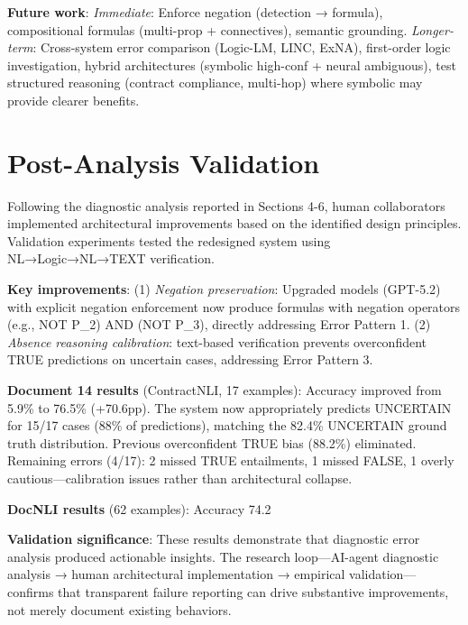 \documentclass[12pt,a4paper]{article}
\begin{document}
\textbf{Future work}: \textit{Immediate}: Enforce negation (detection → formula), compositional formulas (multi-prop + connectives), semantic grounding. \textit{Longer-term}: Cross-system error comparison (Logic-LM, LINC, ExNA), first-order logic investigation, hybrid architectures (symbolic high-conf + neural ambiguous), test structured reasoning (contract compliance, multi-hop) where symbolic may provide clearer benefits.

\section{Post-Analysis Validation}

Following the diagnostic analysis reported in Sections 4-6, human collaborators implemented architectural improvements based on the identified design principles. Validation experiments  tested the redesigned system using NL→Logic→NL→TEXT verification.

\textbf{Key improvements}: (1) \textit{Negation preservation}: Upgraded models (GPT-5.2) with explicit negation enforcement now produce formulas with 
negation operators (e.g., NOT P\_2) AND (NOT P\_3), directly addressing Error Pattern 1. (2) \textit{Absence reasoning calibration}: text-based verification prevents overconfident TRUE predictions on uncertain cases, addressing Error Pattern 3.

\textbf{Document 14 results} (ContractNLI, 17 examples): Accuracy improved from 5.9\% to 76.5\% (+70.6pp). The system now appropriately predicts UNCERTAIN for 15/17 cases (88\% of predictions), matching the 82.4\% UNCERTAIN ground truth distribution. Previous overconfident TRUE bias (88.2\%) eliminated. Remaining errors (4/17): 2 missed TRUE entailments, 1 missed FALSE, 1 overly cautious—calibration issues rather than architectural collapse.

\textbf{DocNLI results} (62 examples): Accuracy 74.2%

\textbf{Validation significance}: These results demonstrate that diagnostic error analysis produced actionable insights. The research loop—AI-agent diagnostic analysis → human architectural implementation → empirical validation—confirms that transparent failure reporting can drive substantive improvements, not merely document existing behaviors.
\end{document}
